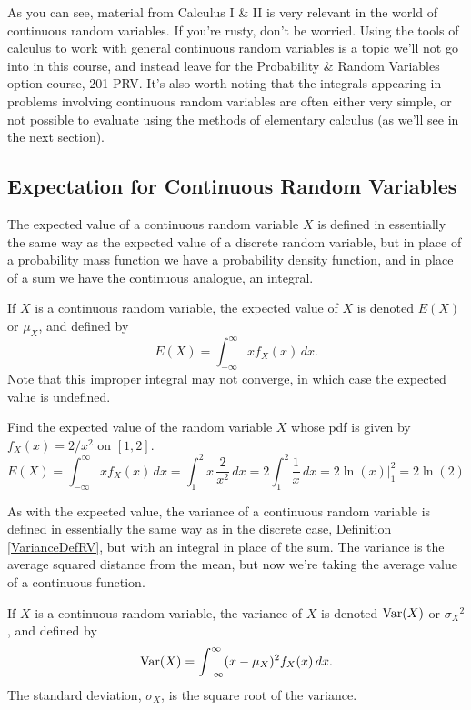As you can see, material from Calculus I \& II is very relevant in the world of continuous random variables. If you're rusty, don't be worried. Using the tools of calculus to work with general continuous random variables is a topic we'll not go into in this course, and instead leave for the Probability \& Random Variables option course, 201-PRV. It's also worth noting that the integrals appearing in problems involving continuous random variables are often either very simple, or not possible to evaluate using the methods of elementary calculus (as we'll see in the next section).

\subsection*{Expectation for Continuous Random Variables}

The expected value of a continuous random variable $X$ is defined in essentially the same way as the expected value of a discrete random variable, but in place of a probability mass function we have a probability density function, and in place of a sum we have the continuous analogue, an integral.

\begin{definition}
If $X$ is a continuous random variable, the expected value of $X$ is denoted $E(X)$ or $\mu_X$, and defined by
$$E(X) = \int_{-\infty}^{\infty}x f_X(x) \, dx.$$
Note that this improper integral may not converge, in which case the expected value is undefined.
\end{definition}

\begin{example}
Find the expected value of the random variable $X$ whose pdf is given by $f_X(x) = 2/x^2$ on $[1,2]$.
$$E(X) = \int_{-\infty}^{\infty}x f_X(x) \, dx = \int_{1}^{2}x \,\frac{2}{x^2} \, dx = 2\int_{1}^{2}\frac{1}{x}\, dx = 2 \ln(x) \bigr|_{1}^{2} = 2\ln(2)$$
\end{example}

As with the expected value, the variance of a continuous random variable is defined in essentially the same way as in the discrete case, Definition \ref{VarianceDefRV}, but with an integral in place of the sum. The variance is the average squared distance from the mean, but now we're taking the average value of a continuous function.

\begin{definition}
If $X$ is a continuous random variable, the variance of $X$ is denoted $\operatorname{Var}(X)$ or ${\sigma_X}^2$, and defined by
$$\operatorname{Var}(X) = \int_{-\infty}^{\infty}(x-\mu_X)^2 f_X(x) \, dx.$$
The standard deviation, $\sigma_X$, is the square root of the variance.
\end{definition}

